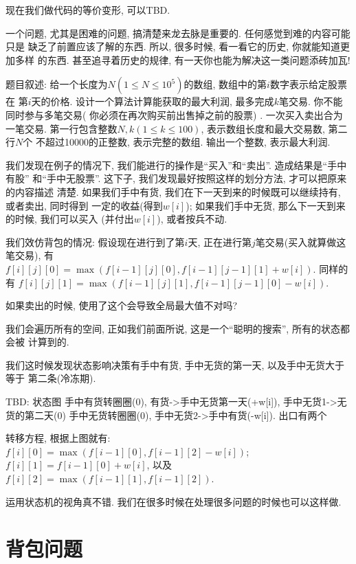 现在我们做代码的等价变形, 可以TBD. 

\begin{remark}
    一个问题, 尤其是困难的问题, 搞清楚来龙去脉是重要的. 任何感觉到难的内容可能只是
    缺乏了前置应该了解的东西. 所以, 很多时候, 看一看它的历史, 你就能知道更加多样
    的东西. 甚至追寻着历史的规律, 有一天你也能为解决这一类问题添砖加瓦! 
\end{remark}

 题目叙述: 给一个长度为$N(1\leq N \leq 10^5)$的数组, 数组中的第$i$数字表示给定股票在
第$i$天的价格. 设计一个算法计算能获取的最大利润, 最多完成$k$笔交易. 你不能同时参与多笔交易( 你必须在再次购买前出售掉之前的股票) .
一次买入卖出合为一笔交易. 第一行包含整数$N,k(1\leq k\leq 100)$, 表示数组长度和最大交易数, 第二行$N$个
不超过10000的正整数, 表示完整的数组. 输出一个整数, 表示最大利润. 

我们发现在例子的情况下, 我们能进行的操作是``买入''和``卖出''. 造成结果是``手中有股''
和``手中无股票''. 这下子, 我们发现最好按照这样的划分方法, 才可以把原来的内容描述
清楚. 如果我们手中有货, 我们在下一天到来的时候既可以继续持有, 或者卖出, 同时得到
一定的收益(得到$w[i]$); 
如果我们手中无货, 那么下一天到来的时候, 我们可以买入 (并付出$w[i]$), 
或者按兵不动. 

我们效仿背包的情况: 假设现在进行到了第$i$天, 正在进行第$j$笔交易(买入就算做这笔交易), 有
$f[i][j][0]=\max(f[i-1][j][0], f[i-1][j-1][1]+w[i])$. 同样的有 
$f[i][j][1]=\max(f[i-1][j][1], f[i-1][j-1][0]-w[i])$. 

\begin{ques}
    如果卖出的时候, 使用了这个会导致全局最大值不对吗? 
\end{ques}

我们会遍历所有的空间, 正如我们前面所说, 这是一个``聪明的搜索'', 所有的状态都会被
计算到的. 

我们这时候发现状态影响决策有手中有货, 手中无货的第一天, 以及手中无货大于等于
第二条(冷冻期). 

TBD: 状态图 手中有货转圈圈(0), 有货->手中无货第一天(+w[i]), 手中无货1->无货的第二天(0) 
手中无货转圈圈(0), 手中无货2->手中有货(-w[i]). 出口有两个

转移方程, 根据上图就有: $f[i][0] = \max(f[i-1][0], f[i-1][2]-w[i])$; 
$f[i][1]=f[i-1][0]+w[i]$, 以及$f[i][2]=\max(f[i-1][1],f[i-1][2])$. 

运用状态机的视角真不错. 我们在很多时候在处理很多问题的时候也可以这样做. 

\section{背包问题} 

